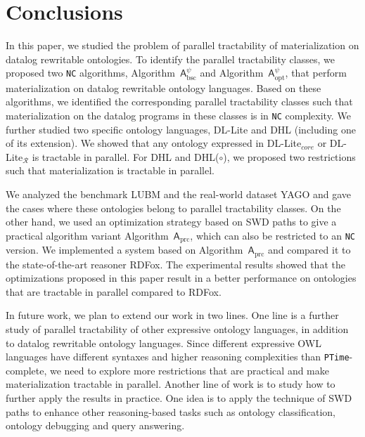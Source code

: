 \section{Conclusions}
\label{sec:conclusion}

In this paper, we studied the problem of parallel tractability of
materialization on datalog rewritable ontologies.
To identify the parallel tractability classes,
we proposed two \texttt{NC} algorithms, Algorithm~$\mathsf{A}_{\text{bsc}}^\psi$
and Algorithm~$\mathsf{A}_{\text{opt}}^\psi$, that perform materialization on
datalog rewritable ontology languages.
Based on these algorithms, we identified the corresponding
parallel tractability classes such that materialization
on the datalog programs in these classes is in \texttt{NC} complexity.
We further studied two specific ontology languages, DL-Lite and DHL (including one of its extension).
We showed that any ontology expressed in DL-Lite$_{core}$ or DL-Lite$_{\mathcal{R}}$ is tractable in parallel.
For DHL and DHL($\circ$), we proposed two restrictions such that materialization is tractable in parallel.

We analyzed the benchmark LUBM and the real-world dataset YAGO
and gave the cases where these ontologies belong to parallel tractability classes.
On the other hand, we used an optimization strategy based on SWD paths
to give a practical algorithm variant Algorithm~$\mathsf{A}_{\text{prc}}$, which can
also be restricted to an \texttt{NC} version.
We implemented a system based on Algorithm~$\mathsf{A}_{\text{prc}}$ and compared it to
the state-of-the-art reasoner RDFox.
The experimental results showed that the optimizations proposed in this paper result in a
better performance on ontologies that are
tractable in parallel compared to RDFox.

In future work, we plan to extend our work in two lines.
One line is a further study of parallel tractability of
other expressive ontology languages, in addition to
datalog rewritable ontology languages. Since different expressive OWL languages
have different syntaxes and higher reasoning complexities than \texttt{PTime}-complete, we need to
explore more restrictions that are practical and make materialization
tractable in parallel. Another line of work is to
study how to further apply the
results in practice.
One idea is to apply the technique of SWD paths to enhance other
reasoning-based tasks such as ontology classification, ontology
debugging and query answering.





